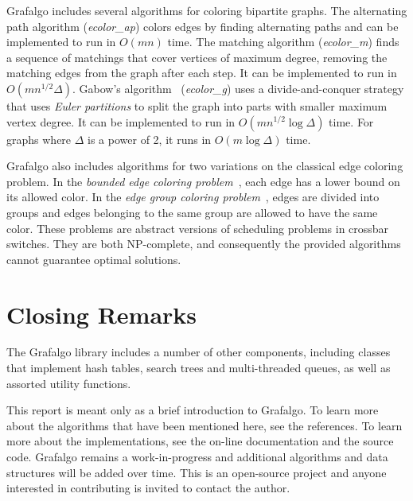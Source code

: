 \documentclass[11pt]{article}
\begin{document}
Grafalgo includes several algorithms for coloring bipartite graphs.
The alternating path algorithm ({\sl ecolor\_ap}) colors edges by finding alternating paths and can be 
implemented to run in $O(mn)$ time.
The matching algorithm ({\sl ecolor\_m}) finds a sequence of matchings that cover vertices of maximum degree,
removing the matching edges from the graph after each step. It can be implemented to run
in $O(m n^{1/2}\Delta)$.
Gabow's algorithm~\cite{GA76} ({\sl ecolor\_g}) uses a divide-and-conquer strategy that uses 
{\sl Euler partitions} to split the
graph into parts with smaller maximum vertex degree. It can be implemented to run in 
$O(m n^{1/2}\log\Delta)$ time. For graphs where $\Delta$ is a power of 2, it runs in 
$O(m \log \Delta)$ time.

Grafalgo also includes algorithms for two variations on the classical edge coloring problem.
In the {\sl bounded edge coloring problem}~\cite{turner-2015c}, each edge has a lower bound on its allowed color.
In the {\sl edge group coloring problem}~\cite{turner-2015a}, edges are divided into groups and edges belonging 
to the same group are allowed to have the same color.
These problems are abstract versions of scheduling problems in crossbar switches.
They are both NP-complete, and consequently the provided algorithms cannot guarantee optimal solutions.

\section{Closing Remarks}

The Grafalgo library includes a number of other components, including
classes that implement hash tables, search trees and multi-threaded queues,
as well as assorted utility functions.

This report is meant only as a brief introduction to Grafalgo.
To learn more about the algorithms that have been mentioned here, see the references.
To learn more about the implementations, see the on-line documentation and the source code.
Grafalgo remains a work-in-progress and additional algorithms and data structures will be added over time.
This is an open-source project and anyone interested in contributing is invited to contact the author.
\end{document}
